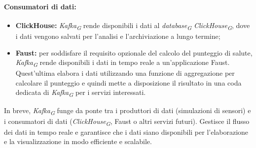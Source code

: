 \paragraph*{Consumatori di dati:}
\begin{itemize}
  \item \textbf{ClickHouse:} \textit{Kafka}\textsubscript{\textit{G}} rende disponibili i dati al \textit{database}\textsubscript{\textit{G}} \textit{ClickHouse}\textsubscript{\textit{G}}, dove i dati vengono salvati per l'analisi e l'archiviazione a lungo termine;
  \item \textbf{Faust:} per soddisfare il requisito opzionale del calcolo del punteggio di salute, \textit{Kafka}\textsubscript{\textit{G}} rende disponibili i dati in tempo reale a un'applicazione Faust. Quest'ultima elabora i dati utilizzando una funzione di aggregazione per calcolare il punteggio e quindi mette a disposizione il risultato in una coda dedicata di \textit{Kafka}\textsubscript{\textit{G}} per i servizi interessati.
\end{itemize}

In breve, \textit{Kafka}\textsubscript{\textit{G}} funge da ponte tra i produttori di dati (simulazioni di sensori) e i consumatori di dati (\textit{ClickHouse}\textsubscript{\textit{G}}, Faust o altri servizi futuri). Gestisce il flusso dei dati in tempo reale e garantisce che i dati siano disponibili per l'elaborazione e la visualizzazione in modo efficiente e scalabile.